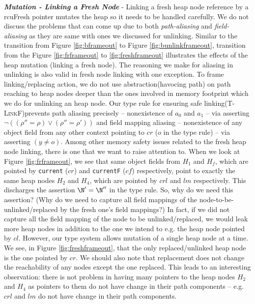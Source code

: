 \textit{\textbf{Mutation - Linking a Fresh Node}} - Linking a fresh heap node reference by a \textsf{rcuFresh} pointer mutates the heap so it needs to be handled carefully. We do not discuss the problems that can come up due to both \textit{path-aliasing} and \textit{field-aliasing} as they are same with ones we discussed for unlinking. Similar to the transition from Figure \ref{fig:bframeout} to Figure \ref{fig:bunlinkframeout}, transition from the Figure \ref{fig:frframeout} to \ref{fig:freshframeout} illustrates the effects of the heap mutation (linking a fresh node). The reasoning we make for aliasing in unlinking is also valid in fresh node linking with one exception. To frame linking/replacing action, we do not use abstraction(havocing path) on path reaching to heap nodes deeper than the ones involved in memory footprint which we do for unlinking an heap node. Our type rule for ensuring safe linking(\textsc{T-LinkF})prevents path aliasing  precisely -- nonexistence of $a_0$ and $a_1$ -- via asserting $\lnot((\rho'' = \rho)\lor(\rho'' = \rho'))$ and field mapping aliasing -- nonexistence of any object field from any other context pointing to $cr$ ($o$ in the type rule) -- via asserting $(y\neq o)$.
Among other memory safety issues related to the fresh heap node linking, there is one that we want to raise attention to. When we look at Figure \ref{fig:frframeout}, we see that same object fields from $H_1$ and $H_f$, which are pointed by \texttt{current} ($cr$) and \texttt{currentF} ($cf$) respectively, point to exactly the same heap nodes $H_2$ and $H_4$, which are pointed by $crl$ and $lm$ respectively. This discharges the assertion $\N' = \N''$ in the type rule. So, why do we need this assertion? (Why do we need to capture all field mappings of the node-to-be-unlinked/replaced by the fresh one's field mappings?) In fact, if we did not capture all the field mapping of the node to be unlinked/replaced, we would leak more heap nodes in addition to the one we intend to e.g. the heap node pointed by $cl$. However, our type system allows mutation of a single heap node at a time. We see, in Figure \ref{fig:freshframeout}, that the only replaced/unlinked heap node is the one pointed by $cr$. We should also note that replacement does not change the reachability of any nodes except the one replaced. This leads to an interesting observation: there is not problem in having many pointers to the heap nodes $H_2$ and $H_4$ as pointers to them do not have change in their path components -- e.g. $crl$ and $lm$ do not have change in their path components. 

